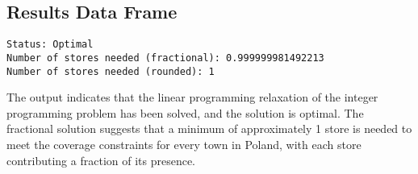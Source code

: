 \subsection*{Results Data Frame}
\begin{verbatim}
Status: Optimal
Number of stores needed (fractional): 0.999999981492213
Number of stores needed (rounded): 1
\end{verbatim}
The output indicates that the linear programming relaxation of the integer programming problem has been solved, and the solution is optimal. The fractional solution suggests that a minimum of approximately 1 store is needed to meet the coverage constraints for every town in Poland, with each store contributing a fraction of its presence.


